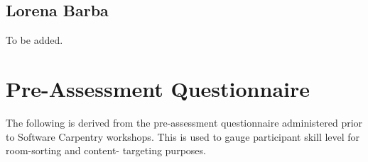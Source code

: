 \documentclass{proposalnsf}
\begin{document}
\subsection{Lorena Barba}

To be added.

\section{Pre-Assessment Questionnaire}
\label{sec:questionnaire}
The following is derived from the pre-assessment questionnaire 
administered prior to Software Carpentry workshops. This is used 
to gauge participant skill level for room-sorting and content-
targeting purposes. %
\end{document}
